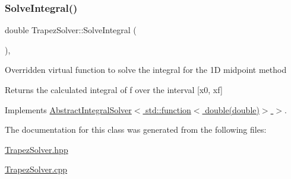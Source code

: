 \subsubsection{\texorpdfstring{Solve\+Integral()}{SolveIntegral()}}
{\footnotesize\ttfamily double Trapez\+Solver\+::\+Solve\+Integral (\begin{DoxyParamCaption}{ }\end{DoxyParamCaption})\hspace{0.3cm}{\ttfamily [override]}, {\ttfamily [virtual]}}

Overridden virtual function to solve the integral for the 1D midpoint method \begin{DoxyReturn}{Returns}
the calculated integral of f over the interval \mbox{[}x0, xf\mbox{]} 
\end{DoxyReturn}


Implements \hyperlink{class_abstract_integral_solver_ad87cb44c5ef3122bc95be48f473ba399}{Abstract\+Integral\+Solver$<$ std\+::function$<$ double(double)$>$ $>$}.



The documentation for this class was generated from the following files\+:\begin{DoxyCompactItemize}
\item 
\hyperlink{_trapez_solver_8hpp}{Trapez\+Solver.\+hpp}\item 
\hyperlink{_trapez_solver_8cpp}{Trapez\+Solver.\+cpp}\end{DoxyCompactItemize}
